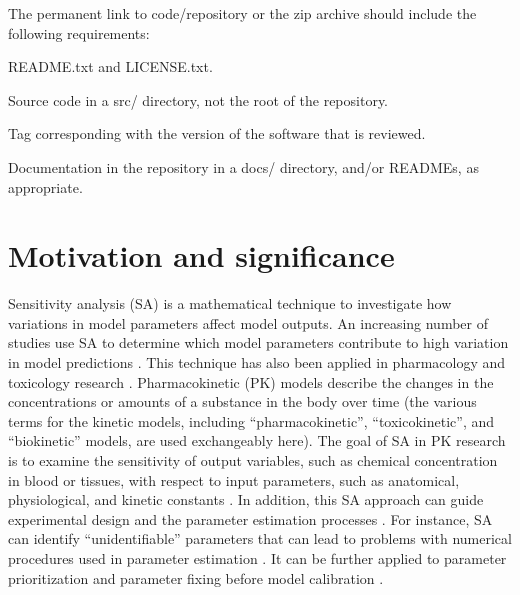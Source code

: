 \documentclass[preprint,12pt, a4paper]{elsarticle}
\begin{document}
\linenumbers


The permanent link to code/repository or the zip archive should include the following requirements: 

README.txt and LICENSE.txt.

Source code in a src/ directory, not the root of the repository.

Tag corresponding with the version of the software that is reviewed.

Documentation in the repository in a docs/ directory, and/or READMEs, as appropriate.




\section{Motivation and significance}
\label{}
Sensitivity analysis (SA) is a mathematical technique to investigate how
variations in model parameters affect model outputs. An increasing
number of studies use SA to determine which model parameters contribute
to high variation in model predictions \cite{ferretti2016trends}. This
technique has also been applied in pharmacology and toxicology research
\cite{loizou2015application, mcnally2012reconstruction}.
Pharmacokinetic (PK) models describe the changes in the concentrations
or amounts of a substance in the body over time (the various terms for
the kinetic models, including ``pharmacokinetic'', ``toxicokinetic'',
and ``biokinetic'' models, are used exchangeably here). The goal of SA
in PK research is to examine the sensitivity of output variables, such
as chemical concentration in blood or tissues, with respect to input
parameters, such as anatomical, physiological, and kinetic constants
\cite{mcnally2011workflow}. In addition, this SA approach can guide
experimental design and the parameter estimation processes
\cite{zhang2015sobol}. For instance, SA can identify ``unidentifiable''
parameters that can lead to problems with numerical procedures used in
parameter estimation \cite{chu2010quantitative}. It can be further
applied to parameter prioritization and parameter fixing before model
calibration \cite{fphar201800588}.
\end{document}
